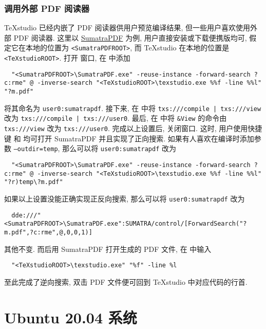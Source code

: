 \subsubsection{调用外部 PDF 阅读器}

\TeX studio 已经内嵌了 PDF 阅读器供用户预览编译结果,
但一些用户喜欢使用外部 PDF 阅读器.
这里以 \href{https://www.sumatrapdfreader.org/free-pdf-reader.html}{SumatraPDF} 为例,
用户直接安装或下载便携版均可,
假定它在本地的位置为 \texttt{<SumatraPDFROOT>},
而 \TeX studio 在本地的位置是 \texttt{<TeXstudioROOT>}.
打开  窗口,
在  中添加
\begin{lstlisting}
  "<SumatraPDFROOT>\SumatraPDF.exe" -reuse-instance -forward-search ?c:rme" @ -inverse-search "<TeXstudioROOT>\texstudio.exe %%f -line %%l" "?m.pdf"
\end{lstlisting}
将其命名为 \texttt{user0:sumatrapdf}.
接下来, 在  中将
\texttt{txs:///compile | txs:///view} 改为
\texttt{txs:///compile | txs:///user0}.
最后, 在  中将 \texttt{\&View} 的命令由
\texttt{txs:///view} 改为 \texttt{txs:///user0}.
完成以上设置后,
关闭窗口.
这时,
用户使用快捷键  和  均可打开 SumatraPDF 并且实现了正向搜索.
如果有人喜欢在编译时添加参数 \texttt{--outdir=temp},
那么可以将 \texttt{user0:sumatrapdf} 改为
\begin{lstlisting}
  "<SumatraPDFROOT>\SumatraPDF.exe" -reuse-instance -forward-search ?c:rme" @ -inverse-search "<TeXstudioROOT>\texstudio.exe %%f -line %%l" "?r)temp\?m.pdf"
\end{lstlisting}

如果以上设置没能正确实现正反向搜索,
那么可以将 \texttt{user0:sumatrapdf} 改为
\begin{lstlisting}
  dde:///"<SumatraPDFROOT>\SumatraPDF.exe":SUMATRA/control/[ForwardSearch("?m.pdf",?c:rme",@,0,0,1)]
\end{lstlisting}
其他不变.
而后用 SumatraPDF 打开生成的 PDF 文件,
在  中输入
\begin{lstlisting}
  "<TeXstudioROOT>\texstudio.exe" "%f" -line %l
\end{lstlisting}
至此完成了逆向搜索,
双击 PDF 文件便可回到 \TeX studio 中对应代码的行首.

\section{Ubuntu 20.04 系统}

